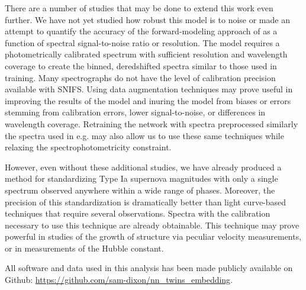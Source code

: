 There are a number of studies that may be done to extend this work even further. We have not yet studied how robust this model is to noise or made an attempt to quantify the accuracy of the forward-modeling approach of \etos{} as a function of spectral signal-to-noise ratio or resolution. The \stoe{} model requires a photometrically calibrated spectrum with sufficient resolution and wavelength coverage to create the binned, deredshifted spectra similar to those used in training. Many spectrographs do not have the level of calibration precision available with SNIFS. Using data augmentation techniques may prove useful in improving the results of the model \citep{boone_avocado_2019} and inuring the model from biases or errors stemming from calibration errors, lower signal-to-noise, or differences in wavelength coverage. Retraining the network with spectra preprocessed similarly the spectra used in e.g. \citet{stahl_deepsip_2020} may also allow us to use these same techniques while relaxing the spectrophotometricity constraint.

However, even without these additional studies, we have already produced a method for standardizing Type Ia supernova magnitudes with only a single spectrum observed anywhere within a wide range of phases. Moreover, the precision of this standardization is dramatically better than light curve-based techniques that require several observations. Spectra with the calibration necessary to use this technique are already obtainable. This technique may prove powerful in studies of the growth of structure via peculiar velocity measurements, or in measurements of the Hubble constant.

All software and data used in this analysis has been made publicly available on Github: \url{https://github.com/sam-dixon/nn_twins_embedding}.
